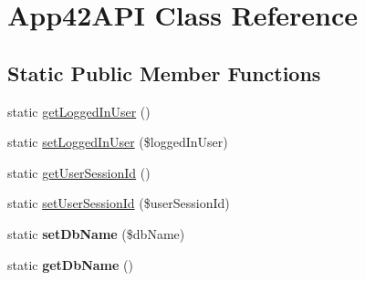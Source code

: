 \hypertarget{class_app42_a_p_i}{\section{App42\+A\+P\+I Class Reference}
\label{class_app42_a_p_i}
}
\subsection*{Static Public Member Functions}
\begin{DoxyCompactItemize}
\item 
static \hyperlink{class_app42_a_p_i_a158fc48684a04e1a9f790bf21a49c42c}{get\+Logged\+In\+User} ()
\item 
static \hyperlink{class_app42_a_p_i_ad8385465bd3419199429181f308d2a41}{set\+Logged\+In\+User} (\$logged\+In\+User)
\item 
static \hyperlink{class_app42_a_p_i_aa0c1383d9e5ce30b6f63b8769c767954}{get\+User\+Session\+Id} ()
\item 
static \hyperlink{class_app42_a_p_i_a47c31550cf7cd30c4ad8d965de098310}{set\+User\+Session\+Id} (\$user\+Session\+Id)
\item 
\hypertarget{class_app42_a_p_i_a392db210c3915539c566cfdb78e1b962}{static {\bfseries set\+Db\+Name} (\$db\+Name)}\label{class_app42_a_p_i_a392db210c3915539c566cfdb78e1b962}

\item 
\hypertarget{class_app42_a_p_i_af5fb2eeb960deaa0368a6113eec09869}{static {\bfseries get\+Db\+Name} ()}\label{class_app42_a_p_i_af5fb2eeb960deaa0368a6113eec09869}


\end{DoxyCompactItemize}
